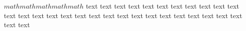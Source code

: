 \documentclass{article}
\begin{document}
$math math math math math$
text text text text text text text text text text text text text text text
text text text text text text text text text text text text text text text
\end{document}
